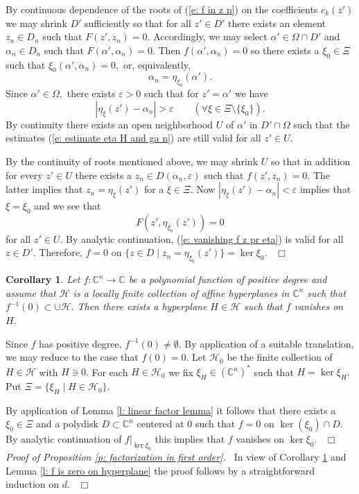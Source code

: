 \documentclass[12pt,a4paper]{article}
\newtheorem{Cor}[Thm]{Corollary}
\newenvironment{cor}[0]{\begin{Cor}\noindent}%
{\end{Cor}}
\def\proof{\par\noindent{\it Proof.}{\ }{\ }}
\def\qed{~\hfill\hbox{$\Box$}\medbreak}
\def\medno{\medbreak\noindent}
\def\qquad{\quad\quad}
\def\msy#1{{\mathbb #1}}
\def\C{{\msy C}}
\def\ga{\alpha}
\def\ge{\varepsilon}
\def\to{\rightarrow}
\def\cH{{\mathcal H}}
\numberwithin{Thm}{section}
\numberwithin{equation}{section}
\numberwithin{equation}{section}
\def\bfhyp{hyperplanes}
\begin{document}
By continuous dependence of the roots of (\ref{e: f in z n}) on the coefficients $c_k(z')$ we may shrink $D'$ sufficiently so that for all $z' \in D'$ there exists an element 
$z_n \in D_n$ such that $F(z', z_n) = 0.$ Accordingly, we may select $\ga' \in \Omega\cap  D'$ and 
$\ga_n \in D_n$ such that $F(\ga', \ga_n) = 0.$ Then $f(\ga', \ga_n) = 0$ so there exists a $\xi_0 \in \Xi$ such that
$\xi_0(\ga', \ga_n) = 0 ,$ or, equivalently, 
$$ 
\ga_n = \eta_{\xi_0}(\ga'). 
$$%
Since $\ga' \in \Omega,$ there exists $\ge >0$ such that for $z' = \ga'$ we have 
\begin{equation}
\label{e: estimate eta H and ga n}
|\eta_\xi(z') - \ga_n| > \ge \qquad (\forall \xi \in \Xi\setminus\{\xi_0\}). 
\end{equation}
By continuity there exists an open neighborhood $U$ of $\ga' $ in $D' \cap \Omega $ 
such that the estimates (\ref{e: estimate eta H and ga n})  are still valid for all $z' \in U.$ 

By the continuity of roots mentioned above, we may shrink
$U$ so that in addition for every $z' \in U$ there exists a $z_n \in D(\ga_n, \ge)$ 
such that $f(z', z_n) = 0.$ The latter implies that $z_n  =  \eta_\xi(z')$ for a $\xi \in\Xi.$ 
Now $|\eta_\xi(z') - \ga_n| < \ge $ implies that $\xi = \xi_0$ and we see that 
\begin{equation} 
\label{e: vanishing f z pr eta}
F(z', \eta_{\xi_0} (z')) = 0
\end{equation} 
for all $z' \in U.$ By analytic continuation, (\ref{e: vanishing f z pr eta}) is valid for all 
$z \in D'.$ Therefore, $f = 0$ on $\{z \in D \mid z_n = \eta_{\xi_0}(z') \} = \ker \xi_0.$ 
\qed

\begin{cor}
\label{c: linear factor cor}
Let $f: \C^n \to \C$ be a polynomial function of positive degree 
and assume that $\cH$ is a locally finite collection of affine {\bfhyp} in $\C^n$ such that $f^{-1}(0) \subset \cup \cH.$ Then there exists a hyperplane $H \in \cH$ such that $f$ vanishes on $H.$ 
\end{cor} 

\proof 
Since $f$ has positive degree, $f^{-1}(0) \neq 
\emptyset.$ By application of a suitable translation, we may reduce
to the case that $f(0) = 0.$ Let $\cH_0$ be the finite collection of $H \in \cH$ with $H \ni 0.$ 
For each $H \in \cH_0$ we fix $\xi_H \in (\C^n)^*$ such that $H = \ker \xi_H.$ Put 
$\Xi =\{\xi_H \mid H \in \cH_0\}.$

By application of Lemma \ref{l: linear factor lemma} it follows that there exists a $\xi_0\in \Xi$ 
and a polydisk $D \subset \C^n$ centered at $0$ such that $f = 0$ on $\ker (\xi_0)\cap D.$ 
 By analytic continuation of $f|_{\ker \xi_0}$ this implies that $f$ vanishes
on $\ker\xi_0.$ 
\qed
\medno
{\em Proof of Proposition \ref{p: factorization in first order}.\ }   In view of Corollary \ref{c: linear factor cor}
and Lemma \ref{l: f is zero on hyperplane} the proof follows by a straightforward induction 
on $d.$
\qed
\end{document}
